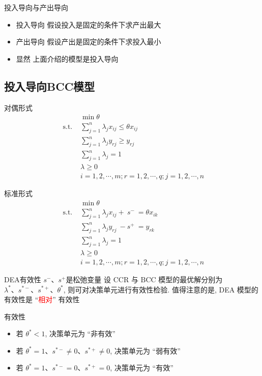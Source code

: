 \documentclass[]{beamer}
\begin{document}
\begin{frame}{投入导向与产出导向}
    \begin{itemize}
        \item 投入导向 假设投入是固定的条件下求产出最大
        \item 产出导向 假设产出是固定的条件下求投入最小
        \item 显然 上面介绍的模型是投入导向
    \end{itemize}    
\end{frame}

\subsection{投入导向BCC模型}

\begin{frame}{对偶形式}
    \begin{align*}
        & \min  \theta \\
        \text { s.t. } & \sum_{j=1}^n \lambda_j x_{i j} \leq \theta x_{i j} \\
        & \sum_{j=1}^n \lambda_j y_{r j} \geq y_{r j} \\
        & \sum_{j=1}^n \lambda_j=1 \\
        & \lambda \geq 0 \\
        & i=1,2, \cdots, m ; r=1,2, \cdots, q ; j=1,2, \cdots, n
    \end{align*}
\end{frame}

\begin{frame}{标准形式}
    \begin{align*}
        & \min  \theta \\
        \text { s.t. } & \sum_{j=1}^n \lambda_j x_{i j} +\ s^{-}\ = \theta x_{i k} \\
        & \sum_{j=1}^n \lambda_j y_{r j} \ - s^{+}\ = y_{r k} \\
        & \sum_{j=1}^n \lambda_j=1 \\
        & \lambda \geq 0 \\
        & i=1,2, \cdots, m ; r=1,2, \cdots, q ; j=1,2, \cdots, n
    \end{align*}
\end{frame}

\begin{frame}{DEA有效性}
    $s^{-} 、 s^{+}$是松弛变量 设 CCR 与 $\mathrm{BCC}$ 模型的最优解分别为 $\lambda^* 、 s^{*-} 、 s^{*+} 、 \theta^*$, 则可对决策单元进行有效性检验. 值得注意的是, DEA 模型的有效性是 “\textcolor{red}{相对}” 有效性
    \begin{block}{有效性}
        \begin{itemize}
            \item 若 $\theta^*<1$, 决策单元为 “非有效”
            \item 若 $\theta^*=1 、 s^{*-} \neq 0 、 s^{*+} \neq 0$, 决策单元为 “弱有效”
            \item 若 $\theta^*=1 、 s^{*-}=0 、 s^{*+}=0$, 决策单元为 “有效”
        \end{itemize}    
    \end{block}    
\end{frame}
\end{document}
